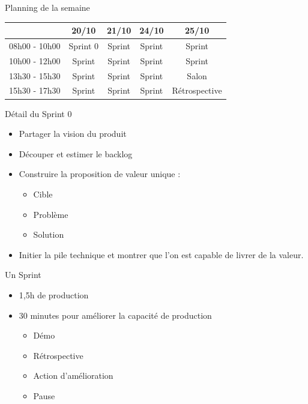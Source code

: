 \documentclass{beamer}
\begin{document}

\begin{frame}{Planning de la semaine}{}
  {
    \center
    \begin{tabular}{l | c | c || c | c | }
                    & \textbf{20/10} & \textbf{21/10} & \textbf{24/10} & \textbf{25/10}  \\
      \hline
      08h00 - 10h00 & Sprint 0       & Sprint         & Sprint         & Sprint          \\
      \hline
      10h00 - 12h00 & Sprint         & Sprint         & Sprint         & Sprint          \\
      \hline
      \hline
      13h30 - 15h30 & Sprint         & Sprint         & Sprint         & Salon           \\
      \hline
      15h30 - 17h30 & Sprint         & Sprint         & Sprint         & Rétrospective   \\
      \hline
    \end{tabular}
  }

\end{frame}

\begin{frame}{Détail du Sprint 0}
  \begin{itemize}
    \item Partager la vision du produit
    \item Découper et estimer le backlog
    \item Construire la proposition de valeur unique :
    \begin{itemize}
      \item Cible
      \item Problème
      \item Solution
    \end{itemize}
    \item Initier la pile technique et montrer que l'on est capable de livrer de la valeur.
  \end{itemize}
\end{frame}

\begin{frame}{Un Sprint}
  \begin{itemize}
    \item 1,5h de production
    \item 30 minutes pour améliorer la capacité de production
    \begin{itemize}
      \item Démo
      \item Rétrospective
      \item Action d'amélioration
      \item Pause
    \end{itemize}
  \end{itemize}
\end{frame}
\end{document}
